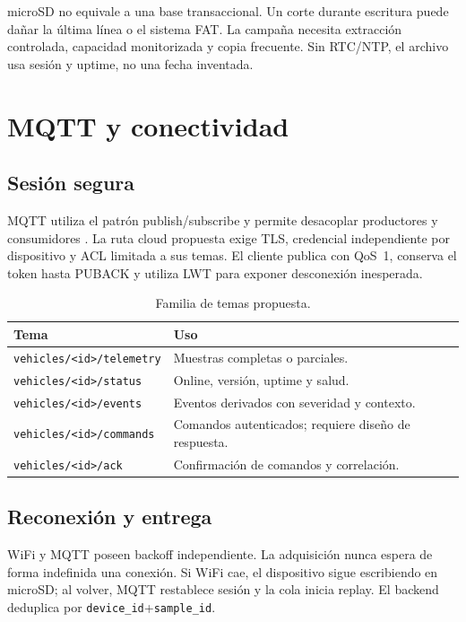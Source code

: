 \documentclass[11pt,a4paper,oneside]{report}
\begin{document}
\begin{vswarning}
microSD no equivale a una base transaccional. Un corte durante escritura puede dañar
la última línea o el sistema FAT. La campaña necesita extracción controlada, capacidad
monitorizada y copia frecuente. Sin RTC/NTP, el archivo usa sesión y uptime, no una
fecha inventada.
\end{vswarning}

\chapter{MQTT y conectividad}

\section{Sesión segura}
MQTT utiliza el patrón publish/subscribe y permite desacoplar productores y
consumidores \cite{mqtt}. La ruta cloud propuesta exige TLS, credencial independiente
por dispositivo y ACL limitada a sus temas. El cliente publica con QoS~1, conserva el
token hasta PUBACK y utiliza LWT para exponer desconexión inesperada.

\begin{table}[H]\centering
\caption{Familia de temas propuesta.}
\begin{tabularx}{\textwidth}{@{}l Y@{}}
\toprule
\textbf{Tema} & \textbf{Uso}\\
\midrule
\texttt{vehicles/<id>/telemetry} & Muestras completas o parciales.\\
\texttt{vehicles/<id>/status} & Online, versión, uptime y salud.\\
\texttt{vehicles/<id>/events} & Eventos derivados con severidad y contexto.\\
\texttt{vehicles/<id>/commands} & Comandos autenticados; requiere diseño de respuesta.\\
\texttt{vehicles/<id>/ack} & Confirmación de comandos y correlación.\\
\bottomrule
\end{tabularx}
\end{table}

\section{Reconexión y entrega}
WiFi y MQTT poseen backoff independiente. La adquisición nunca espera de forma
indefinida una conexión. Si WiFi cae, el dispositivo sigue escribiendo en microSD; al
volver, MQTT restablece sesión y la cola inicia replay. El backend deduplica por
\texttt{device\_id}+\texttt{sample\_id}.
\end{document}
